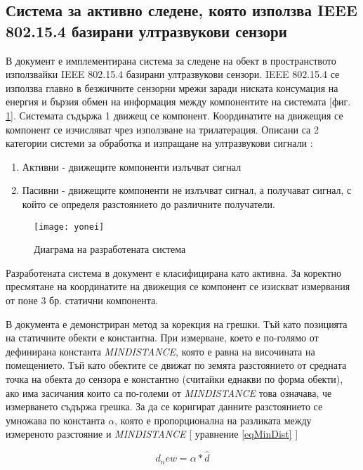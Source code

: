 \subsection{Система за активно следене, която използва IEEE 802.15.4 базирани ултразвукови сензори}

В документ \cite{yonei} е имплементирана система за следене на обект в пространството използвайки IEEE 802.15.4 базирани ултразвукови сензори.
IEEE 802.15.4 се използва главно в безжичните сензорни мрежи заради ниската консумация на енергия и бързия обмен на информация между компонентите на системата [фиг. \ref{fig:yoneiFig}]. Системата съдържа 1 движещ се компонент. Координатите на движещия се компонент се изчисляват чрез използване на трилатерация.  Описани са 2 категории системи за обработка и изпращане на ултразвукови сигнали \cite{sysTypes}:

\begin{enumerate}
    \item Активни - движещите компоненти излъчват сигнал
    \item Пасивни - движещите компоненти не излъчват сигнал, а получават сигнал, с който се определя разстоянието до различните получатели.
\end{enumerate}

\begin{figure}
    \centering
    \texttt{[image: yonei]}
    \caption{Диаграма на разработената система}
    \label{fig:yoneiFig}
\end{figure}

Разработената система в документ \cite{yonei} е класифицирана като активна. За коректно пресмятане на координатите на движещия се компонент се изискват измервания от поне 3 бр. статични компонента. 

В документа е демонстриран метод за корекция на грешки. Тъй като позицията на статичните обекти е константна. При измерване, което е по-голямо от дефинирана константа \textit{MINDISTANCE}, която е равна на височината на помещението. Тъй като обектите се движат по земята разстоянието от средната точка на обекта до сензора е константно (считайки еднакви по форма обекти), ако има засичания които са по-големи от \textit{MINDISTANCE} това означава, че измерването съдържа грешка. За да се коригират данните разстоянието се умножава по константа $\alpha$, която е пропорционална на разликата между измереното разстояние и \textit{MINDISTANCE} [ уравнение \ref{eqMinDist} ]

\begin{equation} \label{eqMinDist}
    d_new = \alpha * \hat{d}
\end{equation}